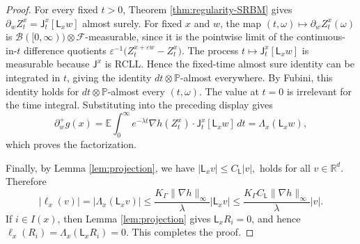 \documentclass[10pt,a4paper]{amsart}
\begin{document}
\begin{proof}
For every fixed \(t>0\), Theorem \ref{thm:regularity-SRBM} gives $\partial_w Z_t^x = \mathsf J_t^x[\mathsf L_xw]$ almost surely. For fixed \(x\) and \(w\), the map $(t,\omega)\mapsto \partial_w Z_t^x(\omega)$ is \(\mathcal B([0,\infty))\otimes\mathcal F\)-measurable, since it is the
pointwise limit of the continuous-in-\(t\) difference quotients $\varepsilon^{-1}\bigl(Z_t^{x+\varepsilon w}-Z_t^x\bigr).$ The process \(t\mapsto \mathsf J_t^x[\mathsf L_xw]\) is measurable because \(\mathsf J^x\) is RCLL. Hence the fixed-time almost sure identity can be integrated in \(t\), giving
the identity \(dt\otimes\mathbb P\)-almost everywhere. By Fubini, this identity holds for \(dt\otimes\mathbb P\)-almost every
\((t,\omega)\). The value at \(t=0\) is irrelevant for the time integral.
Substituting into the preceding display gives
\begin{equation}
\partial_w^+ g(x)
=
\mathbb E\int_0^\infty e^{-\lambda t}
\nabla h(Z_t^x)\cdot \mathsf J_t^x[\mathsf L_xw]\,dt
=
\Lambda_x(\mathsf L_xw),
\end{equation}
which proves the factorization.

Finally, by Lemma \ref{lem:projection}, we have $|\mathsf L_xv|\le C_{\mathsf L}|v|,$ holds for all $v\in\mathbb R^d.$ Therefore
\[
|\ell_x(v)|
=
|\Lambda_x(\mathsf L_xv)|
\le
\frac{K_\Gamma\|\nabla h\|_\infty}{\lambda}|\mathsf L_xv|
\le
\frac{K_\Gamma C_{\mathsf L}\|\nabla h\|_\infty}{\lambda}|v|.
\]
If \(i\in I(x)\), then Lemma \ref{lem:projection} gives \(\mathsf L_xR_i=0\), and hence $\ell_x(R_i)=\Lambda_x(\mathsf L_xR_i)=0.$ This completes the proof.
\end{proof}
\end{document}
